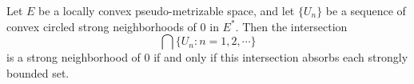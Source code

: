 Let $E$ be a locally convex pseudo-metrizable space, and let $\{U_n\}$ be a sequence of convex circled strong neighborhoods of $0$ in $E^*$. Then the intersection
\[
\bigcap \{U_n : n = 1, 2, \cdots\}
\]
is a strong neighborhood of $0$ if and only if this intersection absorbs each strongly bounded set.
